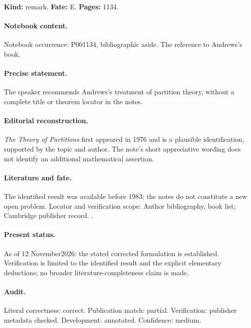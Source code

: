 \label{item:1983-609.4}

\noindent\textbf{Kind:} remark. \textbf{Fate:} E. \textbf{Pages:} 1134.\par

\paragraph{Notebook content.} Notebook occurrence: P001134, bibliographic aside. The reference to Andrews's book.

\paragraph{Precise statement.} The speaker recommends Andrews's treatment of partition theory, without a complete title or theorem locator in the notes.

\paragraph{Editorial reconstruction.} \emph{The Theory of Partitions} first appeared in 1976 and is a plausible identification, supported by the topic and author. The note's short appreciative wording does not identify an additional mathematical assertion.

\paragraph{Literature and fate.} The identified result was available before 1983; the notes do not constitute a new open problem. Locator and verification scope: Author bibliography, book list; Cambridge publisher record. \cite{andrews1976partitions}.

\paragraph{Present status.} As of 12 November2026: the stated corrected formulation is established. Verification is limited to the identified result and the explicit elementary deductions; no broader literature-completeness claim is made.

\paragraph{Audit.} Literal correctness: correct. Publication match: partial. Verification: publisher metadata checked. Development: annotated. Confidence: medium.


